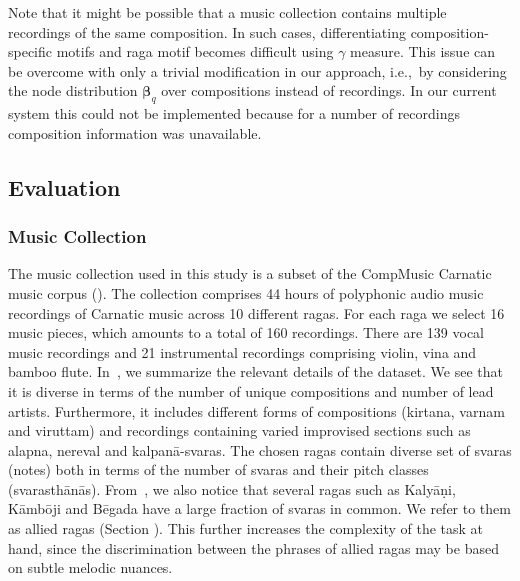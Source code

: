 Note that it might be possible that a music collection contains multiple recordings of the same composition. In such cases, differentiating composition-specific motifs and \gls{raga} motif becomes difficult using $\gamma$ measure. This issue can be overcome with only a trivial modification in our approach, i.e.,~by considering the node distribution ${\boldsymbol{\beta}_q}$ over compositions instead of recordings. In our current system this could not be implemented because for a number of recordings composition information was unavailable.



\subsection{Evaluation}
\label{sec:patterns_characterization_evaluation}

\subsubsection{Music Collection}
\label{sec:patterns_characterization_music_collection}

The music collection used in this study is a subset of the CompMusic Carnatic music corpus (). The collection comprises 44 hours of polyphonic audio music recordings of Carnatic music across 10 different \glspl{raga}. For each \gls{raga} we select 16 music pieces, which amounts to a total of 160 recordings. There are 139 vocal music recordings and 21 instrumental recordings comprising violin, \gls{vina} and bamboo flute. In~, we summarize the relevant details of the dataset. We see that it is diverse in terms of the number of unique compositions and number of lead artists. Furthermore, it includes different forms of compositions (\gls{kirtana}, varnam and viruttam) and recordings containing varied improvised sections such as \gls{alapna}, nereval and kalpan\={a}-\glspl{svara}. %
The chosen \glspl{raga} contain diverse set of \glspl{svara} (notes) both in terms of the number of \glspl{svara} and their pitch classes (svarasth\={a}n\={a}s). From~, 
we also notice that several \glspl{raga} such as Kaly\={a}\d{n}i, K\={a}mb\={o}ji and B\={e}gada have a large fraction of \glspl{svara} in common. We refer to them as allied \glspl{raga} (Section ). This further increases the complexity of the task at hand, since the discrimination between the phrases of allied \glspl{raga} may be based on subtle melodic nuances.


